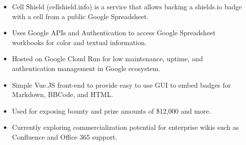 \documentclass[10pt,letter,ragged2e]{altacv}
\begin{document}
\begin{paracol}{2}



\begin{itemize}
\item Cell Shield (cellshield.info) is a service that allows backing a shields.io badge with a cell from a public Google Spreadsheet.
\item Uses Google APIs and Authentication to access Google Spreadsheet workbooks for color and textual information.
\item Hosted on Google Cloud Run for low maintenance, uptime, and authentication management in Google ecosystem.
\item Simple Vue.JS front-end to provide easy to use GUI to embed badges for Markdown, BBCode, and HTML.
\item Used for exposing bounty and prize amounts of \$12,000 and more.
\item Currently exploring commercialization potential for enterprise wikis such as Confluence and Office 365 support.
\end{itemize}



\end{paracol}
\end{document}
